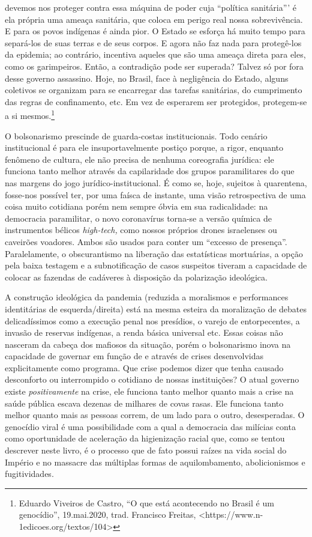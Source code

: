 devemos nos proteger contra essa máquina de poder cuja ``política
sanitária''' é ela própria uma ameaça sanitária, que coloca em perigo
real nossa sobrevivência. E para os povos indígenas é ainda pior. O
Estado se esforça há muito tempo para separá-los de suas terras e de
seus corpos. E agora não faz nada para protegê-los da epidemia; ao
contrário, incentiva aqueles que são uma ameaça direta para eles, como
os garimpeiros. Então, a contradição pode ser superada? Talvez só por
fora desse governo assassino. Hoje, no Brasil, face à negligência do
Estado, alguns coletivos se organizam para se encarregar das tarefas
sanitárias, do cumprimento das regras de confinamento, etc. Em vez de
esperarem ser protegidos, protegem-se a si mesmos.\footnote{Eduardo
  Viveiros de Castro, ``O que está acontecendo no Brasil é um
  genocídio'', 19.mai.2020, trad. Francisco Freitas,
  \textless{}https://www.n-1edicoes.org/textos/104\textgreater{}}

O bolsonarismo prescinde de guarda-costas institucionais. Todo cenário
institucional é para ele insuportavelmente postiço porque, a rigor,
enquanto fenômeno de cultura, ele não precisa de nenhuma coreografia
jurídica: ele funciona tanto melhor através da capilaridade dos grupos
paramilitares do que nas margens do jogo jurídico-institucional. É como
se, hoje, sujeitos à quarentena, fosse-nos possível ter, por uma faísca
de instante, uma visão retrospectiva de uma coisa muito cotidiana porém
nem sempre óbvia em sua radicalidade: na democracia paramilitar, o novo
coronavírus torna-se a versão química de instrumentos bélicos
\emph{high-tech,} como nossos próprios drones israelenses ou caveirões
voadores. Ambos são usados para conter um ``excesso de presença''.
Paralelamente, o obscurantismo na liberação das estatísticas mortuárias,
a opção pela baixa testagem e a subnotificação de casos suspeitos
tiveram a capacidade de colocar as fazendas de cadáveres à disposição da
polarização ideológica.~

A construção ideológica da pandemia (reduzida a moralismos e
performances identitárias de esquerda/direita) está na mesma esteira da
moralização de debates delicadíssimos como a execução penal nos
presídios, o varejo de entorpecentes, a invasão de reservas indígenas, a
renda básica universal etc. Essas coisas não nasceram da cabeça dos
mafiosos da situação, porém o bolsonarismo inova na capacidade de
governar em função de e através de crises desenvolvidas explicitamente
como programa. Que crise podemos dizer que tenha causado desconforto ou
interrompido o cotidiano de nossas instituições? O atual governo existe
\emph{positivamente} na crise, ele funciona tanto melhor quanto mais a
crise na saúde pública escava dezenas de milhares de covas rasas. Ele
funciona tanto melhor quanto mais as pessoas correm, de um lado para o
outro, desesperadas. O genocídio viral é uma possibilidade com a qual a
democracia das milícias conta como oportunidade de aceleração da
higienização racial que, como se tentou descrever neste livro, é o
processo que de fato possui raízes na vida social do Império e no
massacre das múltiplas formas de aquilombamento, abolicionismos e
fugitividades.~

